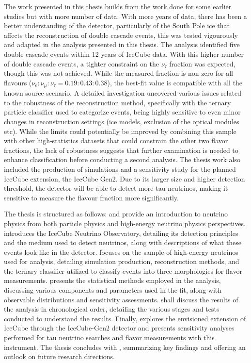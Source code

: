 The work presented in this thesis builds from the work done for some earlier studies  but with more number of data. With more years of data, there has been a better understanding of the detector, particularly of the South Pole ice that affects the reconstruction of double cascade events, this was tested vigourously and adapted in the analysis presented in this thesis. The analysis identified five double cascade events within 12 years of IceCube data. With this higher number of double cascade events, a tighter constraint on the $\nu_{\tau}$ fraction was expected, though this was not achieved. While the measured fraction is non-zero for all flavours ($\nu_e:\nu_{\mu}:\nu_{\tau}=0.19:0.43:0.38$), the best-fit value is compatible with all the known source scenario.  A detailed investigation uncovered various issues related to the robustness of the reconstruction method, specifically with the ternary particle classifier used to categorize events, being highly sensitive to even minor changes in reconstruction settings (ice models, exclusion of the optical modules etc). While the limits could potentially be improved by combining this sample with other high-statistics datasets that could constrain the other two flavor fractions, the lack of robustness suggests that further examination is needed to enhance classification before conducting a second analysis. The thesis work also included the production of simulations and a sensitivity study for the planned IceCube extension, the IceCube Gen2. Due to its larger size and higher detection threshold, the detector will be able to detect more tau neutrinos, making it sensitive to measure the flavour fraction more significantly.


The thesis is structured as follows:  and  provide an introduction to neutrino physics from both particle physics and high-energy neutrino physics perspectives.  introduces the IceCube Neutrino Observatory, detailing its detection principles and the medium used to detect neutrinos, along with descriptions of what these events look like in the detector.  focuses on the sample of high-energy neutrinos used for analysis, detailing simulation production, reconstruction methods, and the ternary classifier utilized to classify events into three morphologies for flavor measurements.  presents the statistical methods employed in the analysis, discussing various components and parameters used in the fit, along with observable distributions and sensitivity assessments.  shall discuss the results of the analysis in chronological order, detailing the various stages and tests conducted to understand the results. Finally,  explores the envisioned extension of IceCube through the IceCube-Gen2 detector and presents sensitivity analyses performed for tau neutrino searches and flavor measurements with this instrument. The thesis concludes with , summarizing key findings and offering an outlook on future research directions.


